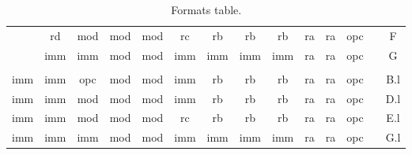 \begin{table}
\begin{tabular}{c|c|c|c|c|c|c|c|c|c|c|c|r|c|}
\cline{2-12}\cline{14-14}
                                & rd                   & mod                  & mod                  & mod                  & rc                   & rb                    & rb                   & rb                   & ra                   & ra                   & opc                  &                       & F                            \\ 
\cline{2-12}\cline{14-14}
                                & imm                  & imm                  & mod                  & mod                  & imm                  & imm                   & imm                  & imm                  & ra                   & ra                   & opc                  &                       & G                            \\ 
\cline{2-12}\cline{14-14}
\multicolumn{1}{l}{}            & \multicolumn{1}{l}{} & \multicolumn{1}{l}{} & \multicolumn{1}{l}{} & \multicolumn{1}{l}{} & \multicolumn{1}{l}{} & \multicolumn{1}{l}{}  & \multicolumn{1}{l}{} & \multicolumn{1}{l}{} & \multicolumn{1}{l}{} & \multicolumn{1}{l}{} & \multicolumn{1}{l}{} & \multicolumn{1}{l}{}  & \multicolumn{1}{l}{}         \\ 
\cline{1-12}\cline{14-14}
\multicolumn{1}{|c|}{imm}       & imm                  & opc                  & mod                  & mod                  & imm                  & rb                    & rb                   & rb                   & ra                   & ra                   & opc                  &                       & B.l                          \\ 
\cline{1-12}\cline{14-14}
\multicolumn{1}{|c|}{imm}       & imm                  & mod                  & mod                  & mod                  & imm                  & rb                    & rb                   & rb                   & ra                   & ra                   & opc                  &                       & D.l                          \\ 
\cline{1-12}\cline{14-14}
\multicolumn{1}{|c|}{imm}       & imm                  & mod                  & mod                  & mod                  & rc                   & rb                    & rb                   & rb                   & ra                   & ra                   & opc                  &                       & E.l                          \\ 
\cline{1-12}\cline{14-14}
\multicolumn{1}{|c|}{imm}       & imm                  & imm                  & mod                  & mod                  & imm                  & imm                   & imm                  & imm                  & ra                   & ra                   & opc                  &                       & G.l                          \\
\cline{1-12}\cline{14-14}
\end{tabular}
\caption[Formats table]{Formats table.}
\end{table}